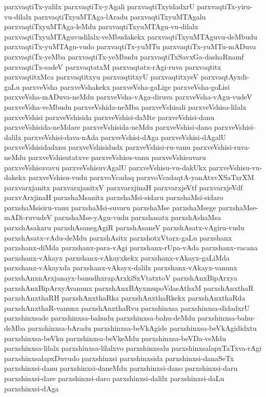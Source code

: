 {parxvaqtiTx-yalilx
parxvaqtiTx-yAgali
parxvaqtiTxyidadxrU
parxvaqtiTx-yiru-vu-dilalx
parxvaqtiTxyuMTAga-lAradu
parxvaqtiTxyuMTAgalu
parxvaqtiTxyuMTAga-leMdu
parxvaqtiTxyuMTAgu-vu-dilalx
parxvaqtiTxyuMTAguvudilalx-veMbudakekx
parxvaqtiTxyuMTAguvu-deMbudu
parxvaqtiTx-yuMTAgu-vudo
parxvaqtiTx-yuMTu
parxvaqtiTx-yuMTu-mADuva
parxvaqtiTx-yeMba
parxvaqtiTx-yeMbudu
parxvaqtiTxSavxGa-dashaRnamf
parxvaqtiTx-sadeV
parxvaqtatxM
parxvaqtatx-rAgi-ruva
parxvaqtitx
parxvaqtitxMca
parxvaqtitxyu
parxvaqtitxyU
parxvaqtitxyeV
parxvaqtAyxdi-gaLu
parxveVsha
parxveVshakekx
parxveVsha-gaLige
parxveVsha-goLisi
parxveVsha-mADuva-neMdu
parxveVsha-vAga-diruva
parxveVsha-vAgu-vudeV
parxveVsha-veMbudu
parxveVshida-neMba
parxveVshisali
parxveVshisa-lilalx
parxveVshisi
parxveVshisida
parxveVshisi-daMte
parxveVshisi-danu
parxveVshisida-neMdare
parxveVshisida-neMdu
parxveVshisi-dano
parxveVshisi-dalilx
parxveVshisi-dava-nAda
parxveVshisi-dAga
parxveVshisi-dAgalU
parxveVshisidadxnu
parxveVshisidudx
parxveVshisi-ru-vanu
parxveVshisi-ruva-neMdu
parxveVshisutatxve
parxveVshisu-vanu
parxveVshisuvaru
parxveVshisuvavu
parxveVshisuvAgalU
parxveVshisu-vu-dakUkx
parxveVshisu-vu-dakekx
parxveVshisu-vudu
parxvoVcadaq
parxvoVcadaqtA-yanAtxvXSaTxrXM
parxvarxjanitx
parxvarxjanitxV
parxvarxjinaH
parxvarxjeVtf
parxvarxjeVdf
parxvArxjinaH
parxshaMsanitx
parxshaMsi-sidaru
parxshaMsi-sidaro
parxshaMsisiru-vanu
parxshaMsi-suvaru
parxshaMse
parxshaMsege
parxshaMse-mADi-ruvudeV
parxshaMse-yAgu-vudu
parxshasatx
parxshAshaMsa
parxshAsakaru
parxshAsanegAgiR
parxshAsaneV
parxshAsatx-vAgiru-vudu
parxshAsatx-vAdu-deMdu
parxshAsitx
parxshotxVtarx-gaLu
parxshanx
parxshanx-diMda
parxshanx-para-vAgi
parxshanx-rUpa-vAda
parxshanx-vacana
parxshanx-vAkayx
parxshanx-vAkayxkekx
parxshanx-vAkayx-gaLiMda
parxshanx-vAkayxda
parxshanx-vAkayx-dalilx
parxshanx-vAkayx-vanunx
parxshAnxnArxjanayx-banudhxrapArxkiSxVtatxtoV
parxshAnxBipArxya
parxshAnxBipArxyAvanunx
parxshAnxBAyxmupoVdasAthxM
parxshAnxthaR
parxshAnxthaRH
parxshAnxthaRka
parxshAnxthaRkekx
parxshAnxthaRda
parxshAnxthaR-vanunx
parxshAnxthaRvu
parxshinxsa
parxshinxsa-didadxrU
parxshinxsade
parxshinxsa-bahudu
parxshinxsa-bahu-deMdu
parxshinxsa-bahu-deMba
parxshinxsa-bAradu
parxshinxsa-beVkAgide
parxshinxsa-beVkAgididxtu
parxshinxsa-beVku
parxshinxsa-beVkeMdu
parxshinxsa-beVDa-veMdu
parxshinxsa-lilalx
parxshinxsa-lilalxvo
parxshinxsalu
parxshinxsalapxTaTxva-rAgi
parxshinxsalapxDuvudo
parxshinxsi
parxshinxsida
parxshinxsi-danaSeTx
parxshinxsi-danu
parxshinxsi-daneMdu
parxshinxsi-dano
parxshinxsi-daru
parxshinxsi-dare
parxshinxsi-daro
parxshinxsi-dalilx
parxshinxsi-daLu
parxshinxsi-dAga
}
